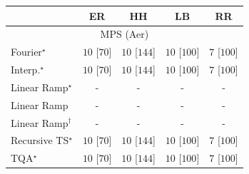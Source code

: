 \begin{tabular}{l|cccc|}
\toprule
            & ER & HH & LB & RR \\
\midrule
\multicolumn{5}{c}{\rule{0pt}{8pt}MPS (Aer)} \\
\midrule
Fourier$^\star$ & {\cellcolor[HTML]{00441B}} \color[HTML]{F1F1F1} $10$ [$70$] & {\cellcolor[HTML]{00441B}} \color[HTML]{F1F1F1} $10$ [$144$] & {\cellcolor[HTML]{00441B}} \color[HTML]{F1F1F1} $10$ [$100$] & {\cellcolor[HTML]{37A055}} \color[HTML]{F1F1F1} $7$ [$100$] \\
Interp.$^\star$ & {\cellcolor[HTML]{00441B}} \color[HTML]{F1F1F1} $10$ [$70$] & {\cellcolor[HTML]{00441B}} \color[HTML]{F1F1F1} $10$ [$144$] & {\cellcolor[HTML]{00441B}} \color[HTML]{F1F1F1} $10$ [$100$] & {\cellcolor[HTML]{37A055}} \color[HTML]{F1F1F1} $7$ [$100$] \\
Linear Ramp$^\star$ & {\cellcolor[HTML]{000000}} \color[HTML]{F1F1F1} {\cellcolor{white}} \color{black} - & {\cellcolor[HTML]{000000}} \color[HTML]{F1F1F1} {\cellcolor{white}} \color{black} - & {\cellcolor[HTML]{000000}} \color[HTML]{F1F1F1} {\cellcolor{white}} \color{black} - & {\cellcolor[HTML]{000000}} \color[HTML]{F1F1F1} {\cellcolor{white}} \color{black} - \\
Linear Ramp & {\cellcolor[HTML]{000000}} \color[HTML]{F1F1F1} {\cellcolor{white}} \color{black} - & {\cellcolor[HTML]{000000}} \color[HTML]{F1F1F1} {\cellcolor{white}} \color{black} - & {\cellcolor[HTML]{000000}} \color[HTML]{F1F1F1} {\cellcolor{white}} \color{black} - & {\cellcolor[HTML]{000000}} \color[HTML]{F1F1F1} {\cellcolor{white}} \color{black} - \\
Linear Ramp$^\dagger$ & {\cellcolor[HTML]{000000}} \color[HTML]{F1F1F1} {\cellcolor{white}} \color{black} - & {\cellcolor[HTML]{000000}} \color[HTML]{F1F1F1} {\cellcolor{white}} \color{black} - & {\cellcolor[HTML]{000000}} \color[HTML]{F1F1F1} {\cellcolor{white}} \color{black} - & {\cellcolor[HTML]{000000}} \color[HTML]{F1F1F1} {\cellcolor{white}} \color{black} - \\
Recursive TS$^\star$ & {\cellcolor[HTML]{00441B}} \color[HTML]{F1F1F1} $10$ [$70$] & {\cellcolor[HTML]{00441B}} \color[HTML]{F1F1F1} $10$ [$144$] & {\cellcolor[HTML]{00441B}} \color[HTML]{F1F1F1} $10$ [$100$] & {\cellcolor[HTML]{37A055}} \color[HTML]{F1F1F1} $7$ [$100$] \\
TQA$^\star$ & {\cellcolor[HTML]{00441B}} \color[HTML]{F1F1F1} $10$ [$70$] & {\cellcolor[HTML]{00441B}} \color[HTML]{F1F1F1} $10$ [$144$] & {\cellcolor[HTML]{00441B}} \color[HTML]{F1F1F1} $10$ [$100$] & {\cellcolor[HTML]{37A055}} \color[HTML]{F1F1F1} $7$ [$100$] \\

\end{tabular}
